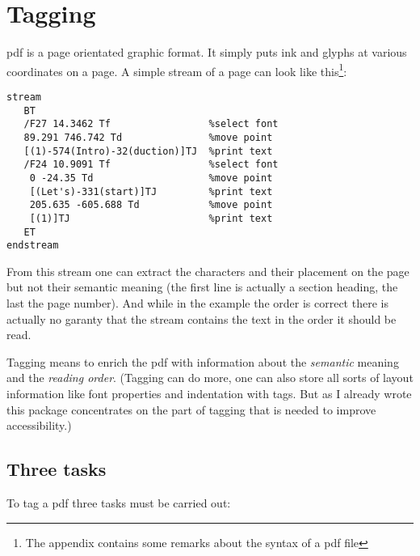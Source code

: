 \documentclass[DIV=12,parskip=half-,bibliography=totoc]{scrartcl}
\begin{document}
\begin{description}
\end{description}

\section{Tagging}

pdf is a page orientated graphic format. It simply puts ink and glyphs at various coordinates on a page. A simple stream of a page can look like this\footnote{The appendix contains some remarks about the syntax of a pdf file}:

\begin{lstlisting}[columns=fixed]
stream
   BT
   /F27 14.3462 Tf                 %select font
   89.291 746.742 Td               %move point
   [(1)-574(Intro)-32(duction)]TJ  %print text
   /F24 10.9091 Tf                 %select font
    0 -24.35 Td                    %move point
    [(Let's)-331(start)]TJ         %print text
    205.635 -605.688 Td            %move point
    [(1)]TJ                        %print text
   ET
endstream
\end{lstlisting}

From this stream one can extract the characters and their placement on the page but not their semantic meaning  (the first line is actually a section heading, the last the page number). And while in the example the order is correct there is actually no garanty that the stream contains the text in the order it should be read.

Tagging means to enrich the pdf with information about the \emph{semantic} meaning and the \emph{reading order}. (Tagging can do more, one can also store all sorts of layout information like font properties and indentation with tags. But as I already wrote this package concentrates on the part of tagging that is needed to improve accessibility.)



\subsection{Three tasks}
To tag a pdf three tasks must be  carried out:
\end{document}
